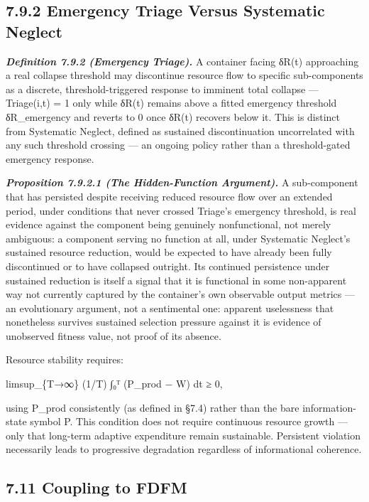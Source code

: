 \documentclass[
]{article}
\begin{document}
\hypertarget{emergency-triage-versus-systematic-neglect}{%
\subsection{7.9.2 Emergency Triage Versus Systematic
Neglect}\label{emergency-triage-versus-systematic-neglect}}

\emph{\textbf{Definition 7.9.2 (Emergency Triage).}} A container facing
δR(t) approaching a real collapse threshold may discontinue resource
flow to specific sub-components as a discrete, threshold-triggered
response to imminent total collapse --- Triage(i,t) = 1 only while δR(t)
remains above a fitted emergency threshold δR\_emergency and reverts to
0 once δR(t) recovers below it. This is distinct from Systematic
Neglect, defined as sustained discontinuation uncorrelated with any such
threshold crossing --- an ongoing policy rather than a threshold-gated
emergency response.

\emph{\textbf{Proposition 7.9.2.1 (The Hidden-Function Argument).}} A
sub-component that has persisted despite receiving reduced resource flow
over an extended period, under conditions that never crossed Triage's
emergency threshold, is real evidence against the component being
genuinely nonfunctional, not merely ambiguous: a component serving no
function at all, under Systematic Neglect's sustained resource
reduction, would be expected to have already been fully discontinued or
to have collapsed outright. Its continued persistence under sustained
reduction is itself a signal that it is functional in some non-apparent
way not currently captured by the container's own observable output
metrics --- an evolutionary argument, not a sentimental one: apparent
uselessness that nonetheless survives sustained selection pressure
against it is evidence of unobserved fitness value, not proof of its
absence.

Resource stability requires:

limsup\_\{T→∞\} (1/T) ∫₀ᵀ (P\_prod − W) dt ≥ 0,

using P\_prod consistently (as defined in §7.4) rather than the bare
information-state symbol P. This condition does not require continuous
resource growth --- only that long-term adaptive expenditure remain
sustainable. Persistent violation necessarily leads to progressive
degradation regardless of informational coherence.

\hypertarget{coupling-to-fdfm}{%
\subsection{7.11 Coupling to FDFM}\label{coupling-to-fdfm}}
\end{document}
